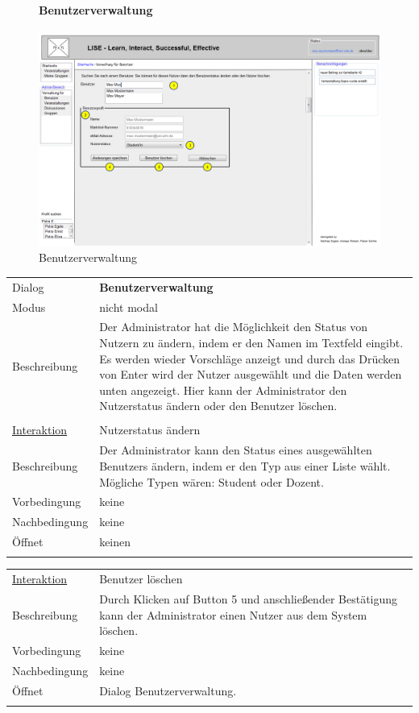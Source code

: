 \documentclass[12pt,a4paper]{article}
\begin{document}
{\begin{figure}[H]
	\centering
	\paragraph{Benutzerverwaltung}
	\includegraphics[width=\textwidth]{Bilder/Mockups/GUI/Benutzerverwaltung[Admin].png}
	\caption{Benutzerverwaltung}
	\label{GuiBenutzerverwaltung}
\end{figure}
\begin{tabular}{l p{12cm}}
	Dialog 	 & \textbf{Benutzerverwaltung} \\ 
	Modus & nicht modal\\ 
	Beschreibung   	& Der Administrator hat die Möglichkeit den Status von Nutzern zu ändern, indem er den Namen im Textfeld eingibt. Es werden wieder Vorschläge anzeigt und durch das Drücken von Enter wird der Nutzer ausgewählt und die Daten werden unten angezeigt. Hier kann der Administrator den Nutzerstatus ändern oder den Benutzer löschen. \\\\
	
	\underline{Interaktion} 	 & Nutzerstatus ändern\\ 
	Beschreibung   	& Der Administrator kann den Status eines ausgewählten Benutzers ändern, indem er den Typ aus einer Liste wählt. Mögliche Typen wären: Student oder Dozent.\\
	Vorbedingung	& keine \\
	Nachbedingung	& keine \\
	Öffnet			& keinen\\\\
\end{tabular}

\begin{tabular}{l p{12cm}}
	\underline{Interaktion} 	 & Benutzer löschen\\ 
	Beschreibung   	& Durch Klicken auf Button 5 und anschließender Bestätigung kann der Administrator einen Nutzer aus dem System löschen.\\
	Vorbedingung	& keine \\
	Nachbedingung	& keine \\
	Öffnet			& Dialog \glqq Benutzerverwaltung\grqq.\\\\
\end{tabular}

}
\end{document}
